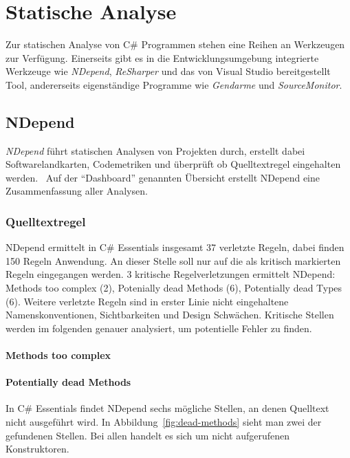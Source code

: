 %
\section{Statische Analyse}
Zur statischen Analyse von C\# Programmen stehen eine Reihen an Werkzeugen zur Verfügung. Einerseits gibt es in die Entwicklungsumgebung integrierte Werkzeuge wie \emph{NDepend}, \emph{ReSharper} und das von Visual Studio bereitgestellt Tool, andererseits eigenständige Programme wie \emph{Gendarme} und \emph{SourceMonitor}.

\subsection{NDepend}
\emph{NDepend} führt statischen Analysen von Projekten durch, erstellt dabei Softwarelandkarten, Codemetriken und überprüft ob Quelltextregel eingehalten werden.~\cite{ndepend} Auf der \enquote{Dashboard} genannten Übersicht erstellt NDepend eine Zusammenfassung aller Analysen. 

\subsubsection{Quelltextregel}
NDepend ermittelt in C\# Essentials insgesamt 37 verletzte Regeln, dabei finden 150 Regeln Anwendung. An dieser Stelle soll nur auf die als kritisch markierten Regeln eingegangen werden. 3 kritische Regelverletzungen ermittelt NDepend: Methods too complex (2), Potenially dead Methods (6), Potentially dead Types (6). Weitere verletzte Regeln sind in erster Linie nicht eingehaltene Namenskonventionen, Sichtbarkeiten und Design Schwächen. Kritische Stellen werden im folgenden genauer analysiert, um potentielle Fehler zu finden.

\paragraph{Methods too complex}

\paragraph{Potentially dead Methods} In C\# Essentials findet NDepend sechs mögliche Stellen, an denen Quelltext nicht ausgeführt wird. In Abbildung~\ref{fig:dead-methods} sieht man zwei der gefundenen Stellen. Bei allen handelt es sich um nicht aufgerufenen Konstruktoren. 

